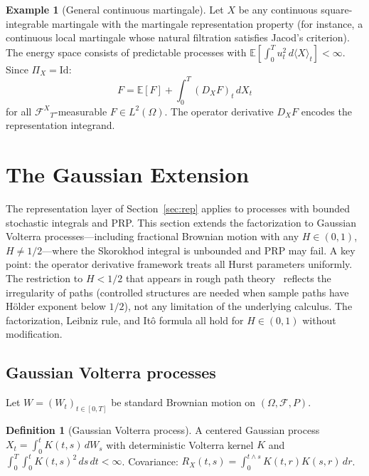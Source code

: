 \documentclass[11pt,a4paper]{article}
\theoremstyle{plain}
\theoremstyle{definition}
\newtheorem{definition}[theorem]{Definition}
\newtheorem{example}[theorem]{Example}
\theoremstyle{remark}
\newcommand{\E}{\mathbb{E}}
\newcommand{\Id}{\mathrm{Id}}
\newcommand{\FX}{\mathcal{F}^X}
\begin{document}
\begin{example}[General continuous martingale]\label{ex:gen_mart}
Let $X$ be any continuous square-integrable martingale with the martingale representation property (for instance, a continuous local martingale whose natural filtration satisfies Jacod's criterion). The energy space consists of predictable processes with $\E[\int_0^T u_t^2\,d\langle X\rangle_t] < \infty$. Since $\Pi_X = \Id$:
\[
F = \E[F] + \int_0^T (D_X F)_t\,dX_t
\]
for all ${\FX}_T$-measurable $F \in L^2(\Omega)$. The operator derivative $D_X F$ encodes the representation integrand.
\end{example}

\section{The Gaussian Extension}\label{sec:gauss}

The representation layer of Section~\ref{sec:rep} applies to processes with bounded stochastic integrals and PRP. This section extends the factorization to Gaussian Volterra processes---including fractional Brownian motion with any $H \in (0,1)$, $H \neq 1/2$---where the Skorokhod integral is unbounded and PRP may fail. A key point: the operator derivative framework treats all Hurst parameters uniformly. The restriction to $H < 1/2$ that appears in rough path theory~\cite{Gubinelli2004} reflects the irregularity of paths (controlled structures are needed when sample paths have H\"older exponent below $1/2$), not any limitation of the underlying calculus. The factorization, Leibniz rule, and It\^o formula all hold for $H \in (0,1)$ without modification.

\subsection{Gaussian Volterra processes}

Let $W = (W_t)_{t \in [0,T]}$ be standard Brownian motion on $(\Omega, \mathcal{F}, P)$.

\begin{definition}[Gaussian Volterra process]\label{def:volterra}
A centered Gaussian process $X_t = \int_0^t K(t,s)\,dW_s$ with deterministic Volterra kernel $K$ and $\int_0^T\int_0^t K(t,s)^2\,ds\,dt < \infty$. Covariance: $R_X(t,s) = \int_0^{t\wedge s}K(t,r)K(s,r)\,dr$.
\end{definition}
\end{document}
